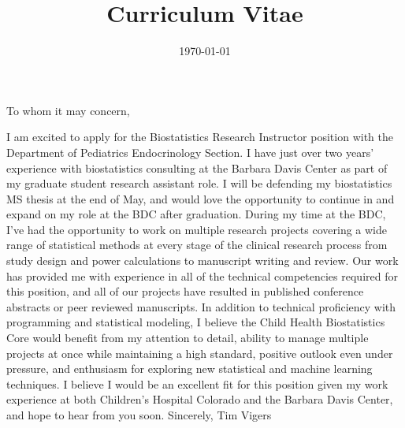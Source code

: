 \documentclass[12pt,letterpaper,sans]{moderncv} %
\title{Curriculum Vitae}
\begin{document}


\clearpage

\date{\today} %
\opening{To whom it may concern,} %

\makelettertitle %
I am excited to apply for the Biostatistics Research Instructor position with the Department of 
Pediatrics Endocrinology Section. I have just over two years' experience with biostatistics
consulting at the Barbara Davis Center as part of my graduate student research assistant role. 
I will be defending my biostatistics MS thesis at the end of May, and would love the opportunity 
to continue in and expand on my role at the BDC after graduation. 
\newline{}\newline{}
During my time at the BDC, I've had the opportunity to work on multiple research projects 
covering a wide range of statistical methods at every stage of the clinical research process from 
study design and power calculations to manuscript writing and review. Our work has provided me with experience 
in all of the technical competencies required for this position, and all of our projects have resulted in published conference abstracts or peer reviewed manuscripts. 
In addition to technical proficiency with programming and statistical modeling, I believe the Child Health Biostatistics Core
would benefit from my attention to detail, ability to manage multiple projects at once while maintaining
a high standard, positive outlook even under pressure, and enthusiasm for exploring new statistical
and machine learning techniques.
\newline{}\newline{}
I believe I would be an excellent fit for this position given my work experience at both 
Children's Hospital Colorado and the Barbara Davis Center, and hope to hear from you soon.
\newline{}\newline{}\newline{}
Sincerely,
\newline{}\newline{}
Tim Vigers
\newpage
\end{document}
